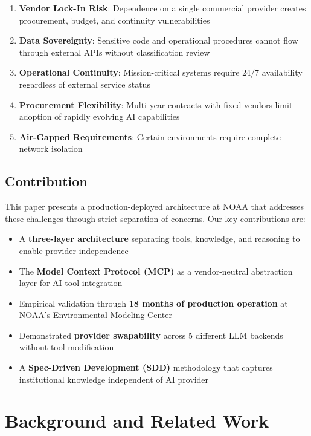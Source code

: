 \documentclass[11pt,twocolumn]{article}
\begin{document}
\begin{enumerate}
    \item \textbf{Vendor Lock-In Risk}: Dependence on a single commercial provider creates procurement, budget, and continuity vulnerabilities
    \item \textbf{Data Sovereignty}: Sensitive code and operational procedures cannot flow through external APIs without classification review
    \item \textbf{Operational Continuity}: Mission-critical systems require 24/7 availability regardless of external service status
    \item \textbf{Procurement Flexibility}: Multi-year contracts with fixed vendors limit adoption of rapidly evolving AI capabilities
    \item \textbf{Air-Gapped Requirements}: Certain environments require complete network isolation
\end{enumerate}

\subsection{Contribution}

This paper presents a production-deployed architecture at NOAA that addresses these challenges through strict separation of concerns. Our key contributions are:

\begin{itemize}
    \item A \textbf{three-layer architecture} separating tools, knowledge, and reasoning to enable provider independence
    \item The \textbf{Model Context Protocol (MCP)} as a vendor-neutral abstraction layer for AI tool integration
    \item Empirical validation through \textbf{18 months of production operation} at NOAA's Environmental Modeling Center
    \item Demonstrated \textbf{provider swapability} across 5 different LLM backends without tool modification
    \item A \textbf{Spec-Driven Development (SDD)} methodology that captures institutional knowledge independent of AI provider
\end{itemize}

\section{Background and Related Work}
\end{document}
